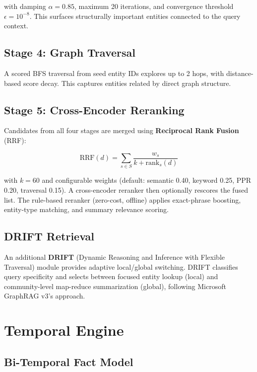 \documentclass[11pt,twocolumn]{article}
\begin{document}
with damping $\alpha = 0.85$, maximum 20 iterations, and convergence threshold $\epsilon = 10^{-8}$. This surfaces structurally important entities connected to the query context.

\subsection{Stage 4: Graph Traversal}

A scored BFS traversal from seed entity IDs explores up to 2 hops, with distance-based score decay. This captures entities related by direct graph structure.

\subsection{Stage 5: Cross-Encoder Reranking}

Candidates from all four stages are merged using \textbf{Reciprocal Rank Fusion} (RRF):

\begin{equation}
\text{RRF}(d) = \sum_{s \in S} \frac{w_s}{k + \text{rank}_s(d)}
\end{equation}

with $k = 60$ and configurable weights (default: semantic 0.40, keyword 0.25, PPR 0.20, traversal 0.15). A cross-encoder reranker then optionally rescores the fused list. The rule-based reranker (zero-cost, offline) applies exact-phrase boosting, entity-type matching, and summary relevance scoring.

\subsection{DRIFT Retrieval}

An additional \textbf{DRIFT} (Dynamic Reasoning and Inference with Flexible Traversal) module provides adaptive local/global switching. DRIFT classifies query specificity and selects between focused entity lookup (local) and community-level map-reduce summarization (global), following Microsoft GraphRAG v3's approach.

\section{Temporal Engine}
\label{sec:temporal}

\subsection{Bi-Temporal Fact Model}
\end{document}
